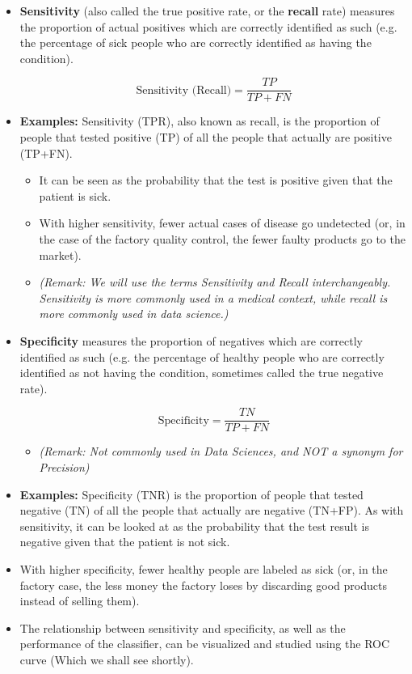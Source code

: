 \documentclass[]{report}
\begin{document}
\begin{itemize}
	\item \textbf{Sensitivity} (also called the true positive rate, or the \textbf{recall} rate) measures
	the proportion of actual positives which are correctly identified
	as such (e.g. the percentage of sick people who are correctly identified
	as having the condition).
	
	\[ \mbox{Sensitivity (Recall)} = \frac{TP}{TP +FN}\]
	\item \textbf{Examples:} Sensitivity (TPR), also known as recall, is the proportion of people that tested positive (TP) of all the people that actually are positive (TP+FN). 
	\begin{itemize}
		\item It can be seen as the probability that the test is positive given that the patient is sick.
		\item With higher sensitivity, fewer actual cases of disease go undetected (or, in the case of the factory quality control, the fewer faulty products go to the market).
		\item \textit{(Remark: We will use the terms Sensitivity and Recall interchangeably.
			Sensitivity is more commonly used in a medical context, while recall is more
			commonly used in data science.)}
	\end{itemize}
	\item \textbf{Specificity} measures the proportion of negatives which are correctly
	identified as such (e.g. the percentage of healthy people who are correctly
	identified as not having the condition, sometimes called the true
	negative rate).
	
	\[ \mbox{Specificity} = \frac{TN}{TP +FN}\]
	
	\begin{itemize}
		\item \textit{(Remark: Not commonly used in Data Sciences, and NOT a synonym for Precision)}
	\end{itemize}
	\item \textbf{Examples:} Specificity (TNR) is the proportion of people that tested negative (TN) of all the people that actually are negative (TN+FP). As with sensitivity, it can be looked at as the probability that the test result is negative given that the patient is not sick. 
	\item With higher specificity, fewer healthy people are labeled as sick (or, in the factory case, the less money the factory loses by discarding good products instead of selling them).
	\item The relationship between sensitivity and specificity, as well as the performance of the classifier, can be visualized and studied using the ROC curve (Which we shall see shortly).
\end{itemize}
\end{document}
